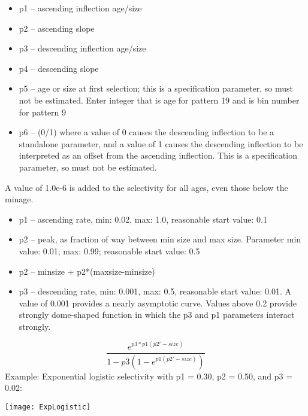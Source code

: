 	\begin{itemize}
		\item p1 – ascending inflection age/size
		\item p2 – ascending slope
		\item p3 – descending inflection age/size
		\item p4 – descending slope
		\item p5 – age or size at first selection; this is a specification parameter, so must not be estimated.  Enter integer that is age for pattern 19 and is bin number for pattern 9
		\item p6 – (0/1)  where a value of 0 causes the descending inflection to be a standalone parameter, and a value of 1 causes the descending inflection to be interpreted as an offset from the ascending inflection.  This is a specification parameter, so must not be estimated.
	\end{itemize}
	A value of 1.0e-6 is added to the selectivity for all ages, even those below the minage.\\

	\begin{itemize}
		\item p1 – ascending rate, min: 0.02, max: 1.0, reasonable start value:  0.1
		\item p2 – peak, as fraction of way between min size and max size.  Parameter min value:  0.01; max:  0.99; reasonable start value:  0.5
		\item p2 – minsize + p2*(maxsize-minsize)
		\item p3 – descending rate, min: 0.001, max: 0.5, reasonable start value:  0.01.  A value of 0.001 provides a nearly asymptotic curve.  Values above 0.2 provide strongly dome-shaped function in which the p3 and p1 parameters interact strongly.
	\end{itemize}
	\begin{equation}
	\frac{e^{p3*p1(p2'-size)}}{1-p3(1-e^{p1(p2'-size)})}
	\end{equation}
	Example: Exponential logistic selectivity with p1 = 0.30, p2 = 0.50, and p3 = 0.02:\\
	\begin{center}
		\texttt{[image: ExpLogistic]}
	\end{center}

